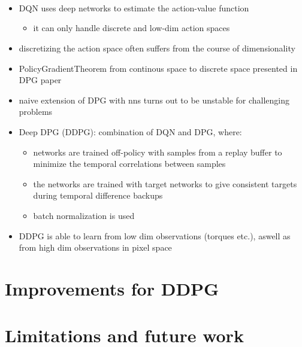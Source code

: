 \\
\\
\\
\begin{itemize}
\item DQN uses deep networks to estimate the action-value function
\begin{itemize}
\item it can only handle discrete and low-dim action spaces
\end{itemize}
\item discretizing the action space often suffers from the course of dimensionality
\item PolicyGradientTheorem from continous space to discrete space presented in DPG paper
\item naive extension of DPG with nns turns out to be unstable for challenging problems
\item Deep DPG (DDPG): combination of DQN and DPG, where:
\begin{itemize}
\item networks are trained off-policy with samples from a replay buffer to minimize the temporal correlations between samples
\item the networks are trained with target networks to give consistent targets during temporal difference backups
\item batch normalization is used
\end{itemize}
\item DDPG is able to learn from low dim observations (torques etc.), aswell as from high dim observations in pixel space
\end{itemize}


\section{Improvements for DDPG}
\label{sec:1}

\section{Limitations and future work}
\label{sec:limfut}

